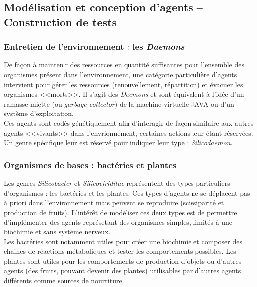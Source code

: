 \documentclass[11pt,twoside,a4paper]{article}
\begin{document}
\clearpage

\subsection{Mod{\'e}lisation et conception d'agents -- Construction de tests}

\subsubsection{Entretien de l'environnement : les \emph{Daemons}}

De fa\c{c}on {\`a} maintenir des ressources en quantit{\'e} suffisantes pour l'ensemble des organismes pr{\'e}sent dans l'environnement, une cat{\'e}gorie particuli{\`e}re d'agents intervient pour g{\'e}rer les ressources (renouvellement, r{\'e}partition) et {\'e}vacuer les organismes <<morts>>. Il s'agit des \emph{Daemons} et sont {\'e}quivalent {\`a} l'id{\'e}e d'un ramasse-miette (ou \emph{garbage collector}) de la machine virtuelle JAVA ou d'un syst{\`e}me d'exploitation.~\\

Ces agents sont cod{\'e}s g{\'e}n{\'e}tiquement afin d'interagir de fa\c{c}on similaire aux autres agents <<vivants>> dans l'envrionnement, certaines actions leur {\'e}tant r{\'e}serv{\'e}es. Un genre sp{\'e}cifique leur est r{\'e}serv{\'e} pour indiquer leur type : \emph{Silicodaemon}. 

\subsubsection{Organismes de bases : bact{\'e}ries et plantes}

Les genres \emph{Silicobacter} et \emph{Silicoviriditae} repr{\'e}sentent des types particuliers d'organismes : les bact{\'e}ries et les plantes. Ces types d'agents ne se d{\'e}placent pas {\`a} priori dans l'environnement mais peuvent se reproduire (scissiparit{\'e} et production de fruits). L'int{\'e}r{\^e}t de mod{\'e}liser ces deux types est de permettre d'impl{\'e}menter des agents repr{\'e}setant des organismes simples, limit{\'e}s {\`a} une biochimie et sans syst{\`e}me nerveux.~\\

Les bact{\'e}ries sont notamment utiles pour cr{\'e}er une biochimie et composer des chaines de r{\'e}actions m{\'e}taboliques et tester les comportements possibles. Les plantes sont utiles pour les comportements de production d'objets ou d'autres agents (des fruits, pouvant devenir des plantes) utilisables par d'autres agents diff{\'e}rents comme sources de nourriture. 
\end{document}
